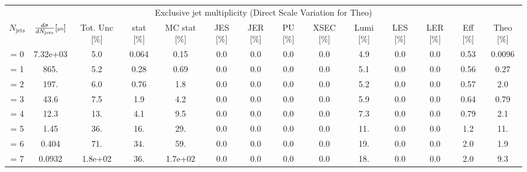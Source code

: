 \documentclass{article}
\begin{document}
\begin{table}[htb!]
\begin{center}
\begin{adjustwidth}{-3cm}{}
\begin{tabular}{c|cc|ccccccccccc}
\multicolumn{14}{c}{Exclusive jet multiplicity (Direct Scale Variation for Theo)} \\
$N_{\text{jets}}$ & $\frac{d\sigma}{dN_{\text{jets}}} \tiny{\left[\text{pb}\right]}$ & \tiny{Tot. Unc [\%]} & \tiny{stat [\%]} & \tiny{MC stat [\%]} & \tiny{JES [\%]} & \tiny{JER [\%]} & \tiny{PU [\%]} & \tiny{XSEC [\%]} & \tiny{Lumi [\%]} & \tiny{LES [\%]} & \tiny{LER [\%]} & \tiny{Eff [\%]} & \tiny{Theo [\%]} \\\hline
= 0 & 7.32e+03 & 5.0 & 0.064 & 0.15 & 0.0 & 0.0 & 0.0 & 0.0 & 4.9 & 0.0 & 0.0 & 0.53&
0.0096 \\
= 1 & 865. & 5.2 & 0.28 & 0.69 & 0.0 & 0.0 & 0.0 & 0.0 & 5.1 & 0.0 & 0.0 & 0.56 &
0.27 \\
= 2 & 197. & 6.0 & 0.76 & 1.8 & 0.0 & 0.0 & 0.0 & 0.0 & 5.2 & 0.0 & 0.0 & 0.57 &
2.0 \\
= 3 & 43.6 & 7.5 & 1.9 & 4.2 & 0.0 & 0.0 & 0.0 & 0.0 & 5.9 & 0.0 & 0.0 & 0.64 &
0.79 \\
= 4 & 12.3 & 13. & 4.1 & 9.5 & 0.0 & 0.0 & 0.0 & 0.0 & 7.3 & 0.0 & 0.0 & 0.79 &
2.1 \\
= 5 & 1.45 & 36. & 16. & 29. & 0.0 & 0.0 & 0.0 & 0.0 & 11. & 0.0 & 0.0 & 1.2 &
11. \\
= 6 & 0.404 & 71. & 34. & 59. & 0.0 & 0.0 & 0.0 & 0.0 & 19. & 0.0 & 0.0 & 2.0 &
1.9 \\
= 7 & 0.0932 & 1.8e+02 & 36. & 1.7e+02 & 0.0 & 0.0 & 0.0 & 0.0 & 18. & 0.0 & 0.0 & 2.0 &
9.3 \\

\end{tabular}
\label{tab:SMuZNGoodJets_Zexc}
\end{adjustwidth}
\end{center}
\end{table}
\end{document}
